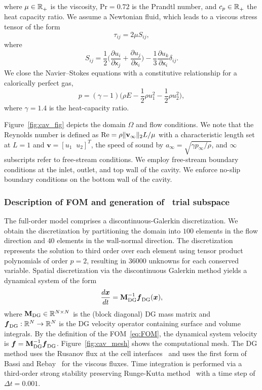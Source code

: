 where $\mu \in \mathbb{R}^{}_{+}$ is the viscosity, $\text{Pr} = 0.72$ is the Prandtl number, and $c_p \in \mathbb{R}^{}_{+}$ the heat capacity ratio.
We assume a Newtonian fluid, which leads to a viscous stress tensor of the form
\begin{equation*}
\tau_{ij} = 2\mu S_{ij},
\end{equation*}
where
\begin{equation*}
 S_{ij} = \frac{1}{2} \big( \frac{\partial u_i}{\partial \mathsf{x}_j} + \frac{\partial u_j}{\partial \mathsf{x}_i} \big) - \frac{1}{3} \frac{\partial      u_k}{\partial \mathsf{x}_i} \delta_{ij}.
\end{equation*}
We close the Navier--Stokes equations with a constitutive relationship for a calorically perfect gas,
$$p = (\gamma - 1)( \rho E - \frac{1}{2} \rho u_1^2 - \frac{1}{2} \rho u_2^2 \big),$$
where $\gamma = 1.4$ is the heat-capacity ratio.

Figure~\ref{fig:cav_fig} depicts the domain $\Omega$ and flow conditions. We note that the Reynolds number is defined as $\text{Re} = \rho \| \mathbf{v}_{\infty} \|_2 L / \mu$ with a characteristic length set at $L=1$ and $\mathbf{v} = [u_1 \; \; u_2]^T$, the speed of sound by $a_{\infty} = \sqrt{\gamma p_{\infty}/\rho}$, and $\infty$ subscripts refer to free-stream conditions. We employ free-stream boundary conditions at the inlet, outlet, and top wall of the cavity. We enforce no-slip boundary conditions 
on the bottom wall of the cavity. 

\subsubsection{Description of FOM and generation of \spatialAcronym\ trial subspace}
The full-order model comprises a discontinuous-Galerkin discretization. We obtain the discretization 
by partitioning the domain into $100$ elements in the flow direction and $40$ elements 
in the wall-normal direction. The discretization represents the solution to third order over each element using tensor product polynomials of order $p=2$, 
resulting in $36000$ unknowns for each conserved variable. Spatial discretization via the discontinuous Galerkin method yields a dynamical system 
of the form
$$\frac{d \boldsymbol x}{dt} = \mathbf{M}_{\text{DG}}^{-1} \boldsymbol f_{\text{DG}} (\boldsymbol x),$$
where $\mathbf{M}_{\text{DG}} \in \mathbb{R}^{N \times N}$ is the (block diagonal) DG mass matrix and $\boldsymbol f_{\text{DG}}: \mathbb{R}^{N} \rightarrow \mathbb{R}^{N}$ is the DG velocity operator containing 
surface and volume integrals. By the definition of the FOM~\eqref{eq:FOM}, the dynamical system velocity is $\boldsymbol f = \mathbf{M}_{\text{DG}}^{-1} \boldsymbol f_{\text{DG}}$. 
Figure~\ref{fig:cav_mesh} shows the computational mesh. The 
DG method uses the Rusanov flux at the cell interfaces~\cite{rusanov} and uses the first form of Bassi and Rebay~\cite{br1} for the viscous fluxes. Time integration 
is performed via a third-order strong stability preserving Runge-Kutta method~\cite{ssp_rk3} with a time step of $\Delta t = 0.001$. 
 
